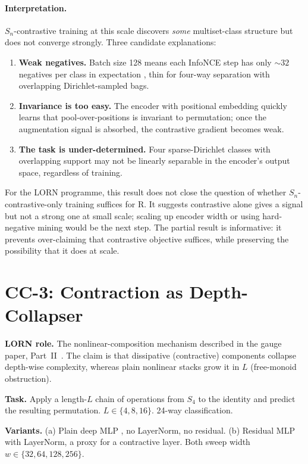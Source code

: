 \documentclass[10pt, twocolumn, a4paper]{article}
\newcommand{\Sn}{S_n}
\begin{document}
\paragraph{Interpretation.} $\Sn$-contrastive training at this scale discovers \emph{some} multiset-class structure but does not converge strongly. Three candidate explanations:
\begin{enumerate}[nosep,leftmargin=*]
\item \textbf{Weak negatives.} Batch size 128 means each InfoNCE step has only $\sim 32$ negatives per class in expectation ,  thin for four-way separation with overlapping Dirichlet-sampled bags.
\item \textbf{Invariance is too easy.} The encoder with positional embedding quickly learns that pool-over-positions is invariant to permutation; once the augmentation signal is absorbed, the contrastive gradient becomes weak.
\item \textbf{The task is under-determined.} Four sparse-Dirichlet classes with overlapping support may not be linearly separable in the encoder's output space, regardless of training.
\end{enumerate}
For the LORN programme, this result does not close the question of whether $\Sn$-contrastive-only training suffices for R. It suggests contrastive alone gives a signal but not a strong one at small scale; scaling up encoder width or using hard-negative mining would be the next step. The partial result is informative: it prevents over-claiming that contrastive objective suffices, while preserving the possibility that it does at scale.

\section{CC-3: Contraction as Depth-Collapser}

\textbf{LORN role.} The nonlinear-composition mechanism described in the gauge paper, Part~II~\cite{gauge-v2}. The claim is that dissipative (contractive) components collapse depth-wise complexity, whereas plain nonlinear stacks grow it in $L$ (free-monoid obstruction).

\textbf{Task.} Apply a length-$L$ chain of operations from $S_4$ to the identity and predict the resulting permutation. $L \in \{4, 8, 16\}$. 24-way classification.

\textbf{Variants.} (a) Plain deep MLP ,  no LayerNorm, no residual. (b) Residual MLP with LayerNorm, a proxy for a contractive layer. Both sweep width $w \in \{32, 64, 128, 256\}$.
\end{document}

